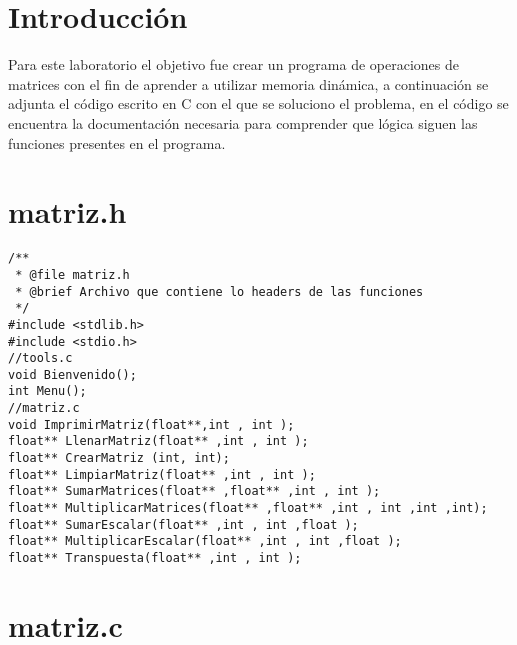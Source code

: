\tableofcontents
\listoffigures
\newpage
\section{Introducción}
Para este laboratorio el objetivo fue crear un programa de operaciones de matrices con el fin de aprender a utilizar memoria dinámica, a continuación se adjunta el código escrito en C con el que se  soluciono el problema, en el código se encuentra la documentación necesaria para comprender que lógica siguen las funciones presentes en el programa.
\newpage
\section{matriz.h}

\begin{verbatim} 
/**
 * @file matriz.h
 * @brief Archivo que contiene lo headers de las funciones
 */
#include <stdlib.h>
#include <stdio.h>
//tools.c
void Bienvenido();
int Menu();
//matriz.c
void ImprimirMatriz(float**,int , int );
float** LlenarMatriz(float** ,int , int );
float** CrearMatriz (int, int);
float** LimpiarMatriz(float** ,int , int );
float** SumarMatrices(float** ,float** ,int , int );
float** MultiplicarMatrices(float** ,float** ,int , int ,int ,int);
float** SumarEscalar(float** ,int , int ,float );
float** MultiplicarEscalar(float** ,int , int ,float );
float** Transpuesta(float** ,int , int );
\end{verbatim}  

\section{matriz.c}

